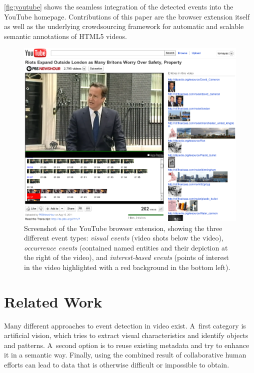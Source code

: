 \documentclass[runningheads,a4paper]{llncs}
\begin{document}
\autoref{fig:youtube} shows the seamless integration of the detected events into the YouTube homepage. Contributions of this paper are the browser extension itself as well as the underlying crowdsourcing framework for automatic and scalable semantic annotations of HTML5 videos.

\begin{figure}[htb!]
\begin{center}
   \includegraphics[width=0.8\linewidth]{./resources/youtube}
\end{center}
   \caption{Screenshot of the YouTube browser extension, showing the three different event types: \emph{visual events} (video shots below the video), \emph{occurrence events} (contained named entities and their depiction at the right of the video), and \emph{interest-based events} (points of interest in the video highlighted with a red background in the bottom left).}
\label{fig:youtube}
\end{figure}

\section{Related Work} \label{sec:related-work}
Many different approaches to event detection in video exist.
A~first category is artificial vision, which tries to extract visual characteristics and identify objects and patterns.
A~second option is to reuse existing metadata and try to enhance it in a semantic way.
Finally, using the combined result of collaborative human efforts can lead to data that is otherwise difficult or impossible to obtain.
\end{document}
